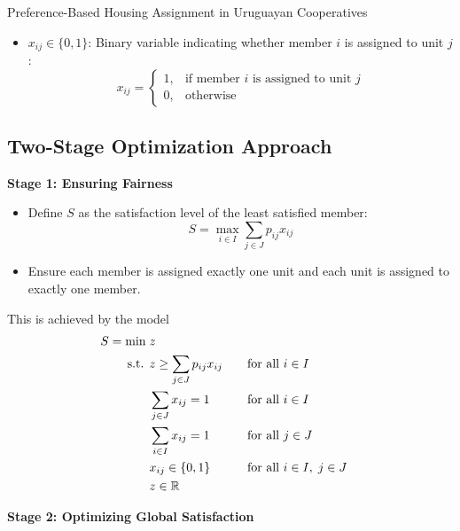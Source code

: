 \begin{casestudybox}{Preference-Based Housing Assignment in Uruguayan Cooperatives}
\begin{itemize}
    \item $x_{ij} \in \{0,1\}$: Binary variable indicating whether member $i$ is assigned to unit $j$:
    \[
    x_{ij} =
    \begin{cases} 
        1, & \text{if member } i \text{ is assigned to unit } j \\ 
        0, & \text{otherwise} 
    \end{cases}
    \]
\end{itemize}

\subsection*{Two-Stage Optimization Approach}

\textbf{Stage 1: Ensuring Fairness}

\begin{itemize}
    \item Define $S$ as the satisfaction level of the least satisfied member:
    \[ S = \max_{i \in I} \sum_{j \in J} p_{ij} x_{ij} \]
    \item Ensure each member is assigned exactly one unit and each unit is assigned to exactly one member.
\end{itemize}
This is achieved by the model
\begin{align*}
    S = \min \; & z \\
\text{ s.t. }        & z \geq \sum_{j \in J} p_{i j} x_{i j} &&\quad \text{for all } i \in I \\
                 & \sum_{j \in J} x_{i j} = 1 &&\quad \text{for all } i \in I \\
                 & \sum_{i \in I} x_{i j} = 1 &&\quad \text{for all } j \in J \\
                 & x_{i j} \in \{0,1\} &&\quad \text{for all } i \in I, \; j \in J \\
                 & z \in \mathbb{R}
\end{align*}

\textbf{Stage 2: Optimizing Global Satisfaction}


\end{casestudybox}
